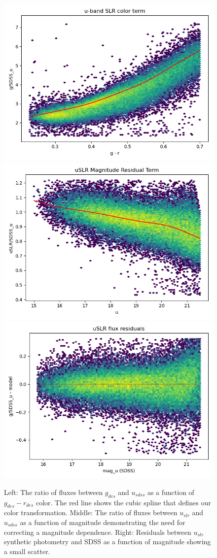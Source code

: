 \begin{figure}
    \includegraphics[width=0.32\linewidth]{./figures/u-band/uslr/transformed_to_SDSS_band_g_slr.png}
    \includegraphics[width=0.32\linewidth]{./figures/u-band/uslr/transformed_to_SDSS_band_g_slr_mag_offset.png}
    \includegraphics[width=0.32\linewidth]{./figures/u-band/uslr/transformed_to_SDSS_band_g_slr_flux_residuals.png}
    \label{fig:slr_spline}
    \caption{
    Left: The ratio of fluxes between $g_{des}$ and $u_{sdss}$ as a function of $g_{des}-r_{des}$ color. The red line shows the cubic spline that defines our color transformation.
    Middle: The ratio of fluxes between $u_{slr}$ and $u_{sdss}$ as a function of magnitude demonstrating the need for correcting a magnitude dependence. 
    Right: Residuals between $u_{slr}$ synthetic photometry and SDSS as a function of magnitude showing a small scatter.}
\end{figure}


